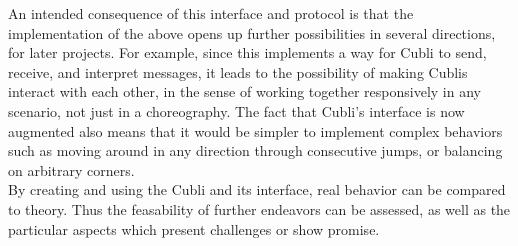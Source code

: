 An intended consequence of this interface and protocol is that the implementation of the above opens up further possibilities in several directions, for later projects. 
For example, since this implements a way for Cubli to send, receive, and interpret messages, it leads to the possibility of making Cublis interact with each other, in the sense of working together responsively in any scenario, not just in a choreography.
The fact that Cubli's interface is now augmented also means that it would be simpler to implement complex behaviors such as moving around in any direction through consecutive jumps, or balancing on arbitrary corners.\\

By creating and using the Cubli and its interface, real behavior can be compared to theory. Thus the feasability of further endeavors can be assessed, as well as the particular aspects which present challenges or show promise.

 \cleardoublepage


